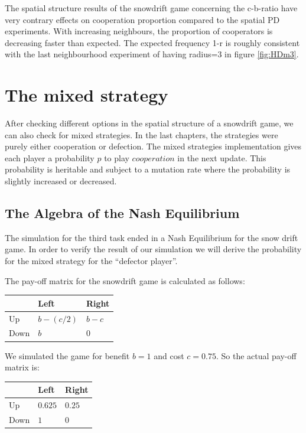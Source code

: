 \documentclass[DIV=calc, paper=a4, fontsize=11pt, twocolumn]{scrartcl}	 %
\begin{document}
The spatial structure results of the snowdrift game concerning the c-b-ratio have very contrary effects on cooperation proportion compared to the spatial PD experiments. With increasing neighbours, the proportion of cooperators is decreasing faster than expected. The expected frequency 1-r is roughly consistent with the last neighbourhood experiment of having radius=3 in figure \ref{fig:HDm3}.  \\

\section*{The mixed strategy}

After checking different options in the spatial structure of a snowdrift game, we can also check for mixed strategies. In the last chapters, the strategies were purely either cooperation or defection. The mixed strategies implementation gives each player a probability $p$ to play $cooperation$ in the next update. This probability is heritable and subject to a mutation rate where the probability is slightly increased or decreased. \\



\subsection*{The Algebra of the Nash Equilibrium}

The simulation for the third task ended in a Nash Equilibrium
for the snow drift game. In order to verify the result of our
simulation we will derive the probability for the mixed strategy
for the ``defector player''.

The pay-off matrix for the snowdrift game is calculated as follows:\\

\begin{tabular}{l|ll}
  & Left & Right \\
\midrule
Up & $b-(c/2)$ & $b-c$ \\
Down & $b$ & $0$ \\
\end{tabular}

We simulated the game for benefit $b=1$ and cost $c=0.75$.
So the actual pay-off matrix is:\\

\begin{tabular}{l|ll}
  & Left & Right \\
\midrule
Up & $0.625$ & $0.25$ \\
Down & $1$ & $0$ \\
\end{tabular}
\end{document}
